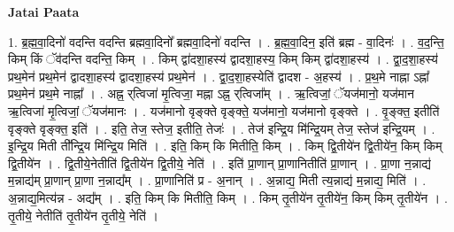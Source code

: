 \documentclass[17pt]{extarticle}
\begin{document}
\textbf{Jatai Paata} \newline

1. ब्र॒ह्म॒वा॒दिनो॑ वदन्ति वदन्ति ब्रह्मवा॒दिनो᳚ ब्रह्मवा॒दिनो॑ वदन्ति । . ब्र॒ह्म॒वा॒दिन॒ इति॑ ब्रह्म - वा॒दिनः॑ । . व॒द॒न्ति॒ किम् किं ॅव॑दन्ति वदन्ति॒ किम् । . किम् द्वा॑दशा॒हस्य॑ द्वादशा॒हस्य॒ किम् किम् द्वा॑दशा॒हस्य॑ । . द्वा॒द॒शा॒हस्य॑ प्रथ॒मेन॑ प्रथ॒मेन॑ द्वादशा॒हस्य॑ द्वादशा॒हस्य॑ प्रथ॒मेन॑ । . द्वा॒द॒शा॒हस्येति॑ द्वादश - अ॒हस्य॑ । . प्र॒थ॒मे नाह्ना ऽह्ना᳚ प्रथ॒मेन॑ प्रथ॒मे नाह्ना᳚ । . अह्न॒ र्‌त्विजा॑ मृ॒त्विजा॒ मह्ना ऽह्न॒ र्‌त्विजा᳚म् । . ऋ॒त्विजां॒ ॅयज॑मानो॒ यज॑मान ऋ॒त्विजा॑ मृ॒त्विजां॒ ॅयज॑मानः । . यज॑मानो वृङ्क्ते वृङ्क्ते॒ यज॑मानो॒ यज॑मानो वृङ्क्ते । . वृ॒ङ्क्त॒ इतीति॑ वृङ्क्ते वृङ्क्त॒ इति॑ । . इति॒ तेज॒ स्तेज॒ इतीति॒ तेजः॑ । . तेज॑ इन्द्रि॒य मि॑न्द्रि॒यम् तेज॒ स्तेज॑ इन्द्रि॒यम् । . इ॒न्द्रि॒य मिती ती᳚न्द्रि॒य मि॑न्द्रि॒य मिति॑ । . इति॒ किम् कि मितीति॒ किम् । . किम् द्वि॒तीये॑न द्वि॒तीये॑न॒ किम् किम् द्वि॒तीये॑न । . द्वि॒तीये॒नेतीति॑ द्वि॒तीये॑न द्वि॒तीये॒ नेति॑ । . इति॑ प्रा॒णान् प्रा॒णानितीति॑ प्रा॒णान् । . प्रा॒णा न॒न्नाद्य॑ म॒न्नाद्य॑म् प्रा॒णान् प्रा॒णा न॒न्नाद्य᳚म् । . प्रा॒णानिति॑ प्र - अ॒नान् । . अ॒न्नाद्य॒ मिती त्य॒न्नाद्य॑ म॒न्नाद्य॒ मिति॑ । . अ॒न्नाद्य॒मित्य॑न्न - अद्य᳚म् । . इति॒ किम् कि मितीति॒ किम् । . किम् तृ॒तीये॑न तृ॒तीये॑न॒ किम् किम् तृ॒तीये॑न । . तृ॒तीये॒ नेतीति॑ तृ॒तीये॑न तृ॒तीये॒ नेति॑ । \newline
\end{document}
